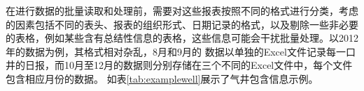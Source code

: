 在进行数据的批量读取和处理前，需要对这些报表按照不同的格式进行分类，考虑的因素包括不同的表头、报表的组织形式、日期记录的格式，以及剔除一些非必要的表格，例如某些含有总结性信息的表格，这些信息可能会干扰批量处理。以2012年的数据为例，其格式相对杂乱，8月和9月的
数据以单独的Excel文件记录每一口井的日报，而10月至12月的数据则分别存储在三个不同的Excel文件中，每个文件包含相应月份的数据。
如表\ref{tab:examplewell}展示了气井包含信息示例。

